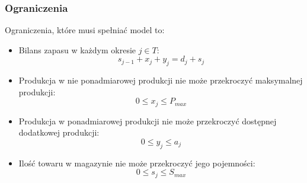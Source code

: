 \documentclass[11pt,a4paper]{article}
\numberwithin{equation}{section}
\begin{document}
\subsubsection{Ograniczenia}
Ograniczenia, które musi spełniać model to:
\begin{itemize}
    \item Bilans zapasu w każdym okresie $j \in T$:
        \[
            s_{j-1} + x_j + y_j = d_j + s_j
        \]
    \item Produkcja w nie ponadmiarowej produkcji nie może przekroczyć maksymalnej produkcji:
        \[
            0 \leq x_j \leq P_{max}
        \]
    \item Produkcja w ponadmiarowej produkcji nie może przekroczyć dostępnej dodatkowej produkcji:
        \[
            0 \leq y_j \leq a_j
        \]
    \item Ilość towaru w magazynie nie może przekroczyć jego pojemności:
        \[
            0 \leq s_j \leq S_{max}
        \]
\end{itemize}
\end{document}

